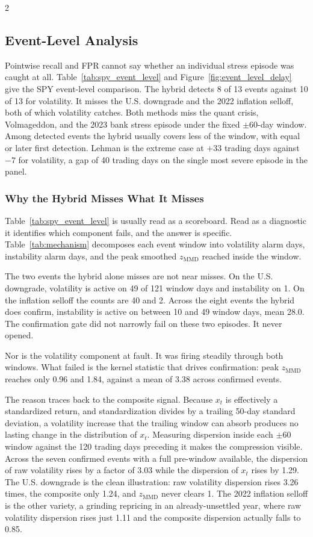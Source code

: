 \documentclass{book}
\begin{document}
\begin{multicols}{2}
\subsection{Event-Level Analysis}
Pointwise recall and FPR cannot say whether an individual stress episode was caught at all. Table~\ref{tab:spy_event_level} and Figure~\ref{fig:event_level_delay} give the SPY event-level comparison. The hybrid detects 8 of 13 events against 10 of 13 for volatility. It misses the U.S. downgrade and the 2022 inflation selloff, both of which volatility catches. Both methods miss the quant crisis, Volmageddon, and the 2023 bank stress episode under the fixed $\pm60$-day window. Among detected events the hybrid usually covers less of the window, with equal or later first detection. Lehman is the extreme case at $+33$ trading days against $-7$ for volatility, a gap of 40 trading days on the single most severe episode in the panel.

\subsubsection{Why the Hybrid Misses What It Misses}
\label{sec:mechanism}
Table~\ref{tab:spy_event_level} is usually read as a scoreboard. Read as a diagnostic it identifies which component fails, and the answer is specific. Table~\ref{tab:mechanism} decomposes each event window into volatility alarm days, instability alarm days, and the peak smoothed $z_{\mathrm{MMD}}$ reached inside the window.

The two events the hybrid alone misses are not near misses. On the U.S. downgrade, volatility is active on 49 of 121 window days and instability on 1. On the inflation selloff the counts are 40 and 2. Across the eight events the hybrid does confirm, instability is active on between 10 and 49 window days, mean 28.0. The confirmation gate did not narrowly fail on these two episodes. It never opened.

Nor is the volatility component at fault. It was firing steadily through both windows. What failed is the kernel statistic that drives confirmation: peak $z_{\mathrm{MMD}}$ reaches only 0.96 and 1.84, against a mean of 3.38 across confirmed events.

The reason traces back to the composite signal. Because $x_t$ is effectively a standardized return, and standardization divides by a trailing 50-day standard deviation, a volatility increase that the trailing window can absorb produces no lasting change in the distribution of $x_t$. Measuring dispersion inside each $\pm60$ window against the 120 trading days preceding it makes the compression visible. Across the seven confirmed events with a full pre-window available, the dispersion of raw volatility rises by a factor of 3.03 while the dispersion of $x_t$ rises by 1.29. The U.S. downgrade is the clean illustration: raw volatility dispersion rises 3.26 times, the composite only 1.24, and $z_{\mathrm{MMD}}$ never clears 1. The 2022 inflation selloff is the other variety, a grinding repricing in an already-unsettled year, where raw volatility dispersion rises just 1.11 and the composite dispersion actually falls to 0.85.


\end{multicols}
\end{document}
